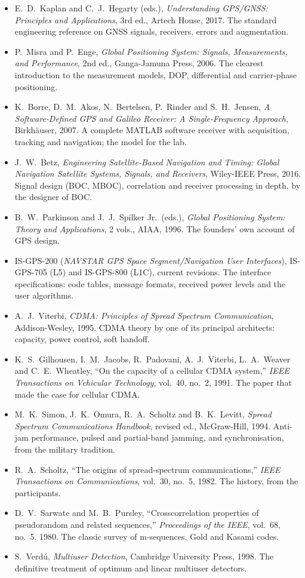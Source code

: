 \furtherreading
\begin{itemize}
\item E.~D.~Kaplan and C.~J.~Hegarty (eds.), \emph{Understanding GPS/GNSS: Principles and
Applications}, 3rd ed., Artech House, 2017. The standard engineering reference on GNSS signals,
receivers, errors and augmentation.
\item P.~Misra and P.~Enge, \emph{Global Positioning System: Signals, Measurements, and
Performance}, 2nd ed., Ganga-Jamuna Press, 2006. The clearest introduction to the measurement
models, DOP, differential and carrier-phase positioning.
\item K.~Borre, D.~M.~Akos, N.~Bertelsen, P.~Rinder and S.~H.~Jensen, \emph{A Software-Defined GPS
and Galileo Receiver: A Single-Frequency Approach}, Birkh\"auser, 2007. A complete MATLAB
software receiver with acquisition, tracking and navigation; the model for the lab.
\item J.~W.~Betz, \emph{Engineering Satellite-Based Navigation and Timing: Global Navigation
Satellite Systems, Signals, and Receivers}, Wiley-IEEE Press, 2016. Signal design (BOC, MBOC),
correlation and receiver processing in depth, by the designer of BOC.
\item B.~W.~Parkinson and J.~J.~Spilker Jr.\ (eds.), \emph{Global Positioning System: Theory and
Applications}, 2 vols., AIAA, 1996. The founders' own account of GPS design.
\item IS-GPS-200 (\emph{NAVSTAR GPS Space Segment/Navigation User Interfaces}), IS-GPS-705 (L5)
and IS-GPS-800 (L1C), current revisions. The interface specifications: code tables, message
formats, received power levels and the user algorithms.
\item A.~J.~Viterbi, \emph{CDMA: Principles of Spread Spectrum Communication}, Addison-Wesley,
1995. CDMA theory by one of its principal architects: capacity, power control, soft handoff.
\item K.~S.~Gilhousen, I.~M.~Jacobs, R.~Padovani, A.~J.~Viterbi, L.~A.~Weaver and C.~E.~Wheatley,
``On the capacity of a cellular CDMA system,'' \emph{IEEE Transactions on Vehicular Technology},
vol.~40, no.~2, 1991. The paper that made the case for cellular CDMA.
\item M.~K.~Simon, J.~K.~Omura, R.~A.~Scholtz and B.~K.~Levitt, \emph{Spread Spectrum
Communications Handbook}, revised ed., McGraw-Hill, 1994. Anti-jam performance, pulsed and
partial-band jamming, and synchronisation, from the military tradition.
\item R.~A.~Scholtz, ``The origins of spread-spectrum communications,'' \emph{IEEE Transactions on
Communications}, vol.~30, no.~5, 1982. The history, from the participants.
\item D.~V.~Sarwate and M.~B.~Pursley, ``Crosscorrelation properties of pseudorandom and related
sequences,'' \emph{Proceedings of the IEEE}, vol.~68, no.~5, 1980. The classic survey of
m-sequences, Gold and Kasami codes.
\item S.~Verd\'u, \emph{Multiuser Detection}, Cambridge University Press, 1998. The definitive
treatment of optimum and linear multiuser detectors.
\end{itemize}
